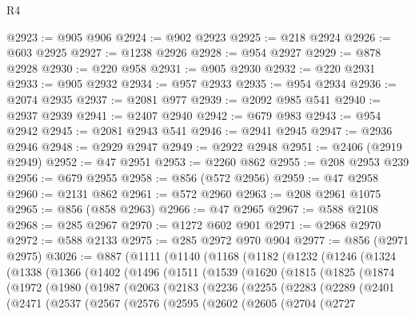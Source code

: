 \begin{lexlean}{R4}
\begin{coremodule}
@2923 := @905 @906
@2924 := @902 @2923
@2925 := @218 @2924
@2926 := @603 @2925
@2927 := @1238 @2926
@2928 := @954 @2927
@2929 := @878 @2928
@2930 := @220 @958
@2931 := @905 @2930
@2932 := @220 @2931
@2933 := @905 @2932
@2934 := @957 @2933
@2935 := @954 @2934
@2936 := @2074 @2935
@2937 := @2081 @977
@2939 := @2092 @985 @541
@2940 := @2937 @2939
@2941 := @2407 @2940
@2942 := @679 @983
@2943 := @954 @2942
@2945 := @2081 @2943 @541
@2946 := @2941 @2945
@2947 := @2936 @2946
@2948 := @2929 @2947
@2949 := @2922 @2948
@2951 := @2406 (@2919 @2949)
@2952 := @47 @2951
@2953 := @2260 @862
@2955 := @208 @2953 @239
@2956 := @679 @2955
@2958 := @856 (@572 @2956)
@2959 := @47 @2958
@2960 := @2131 @862
@2961 := @572 @2960
@2963 := @208 @2961 @1075
@2965 := @856 (@858 @2963)
@2966 := @47 @2965
@2967 := @588 @2108
@2968 := @285 @2967
@2970 := @1272 @602 @901
@2971 := @2968 @2970
@2972 := @588 @2133
@2975 := @285 @2972 @970 @904
@2977 := @856 (@2971 @2975)
@3026 := @887
    (@1111
      (@1140
        (@1168
          (@1182
            (@1232
              (@1246
                (@1324
                  (@1338
                    (@1366
                      (@1402
                        (@1496
                          (@1511
                            (@1539
                              (@1620
                                (@1815
                                  (@1825
                                    (@1874
                                      (@1972
                                        (@1980
                                          (@1987
                                            (@2063
                                              (@2183
                                                (@2236
                                                  (@2255
                                                    (@2283
                                                      (@2289
                                                        (@2401
                                                          (@2471
                                                            (@2537
                                                              (@2567
                                                                (@2576
                                                                  (@2595
                                                                    (@2602
                                                                      (@2605
                                                                        (@2704
                                                                          (@2727

\end{coremodule}
\end{lexlean}
